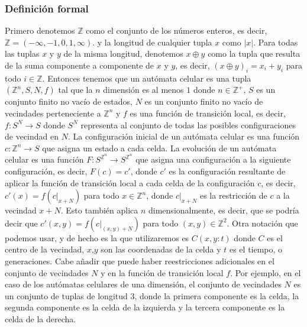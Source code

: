 \subsubsection{Definici\'on formal}
    \label{sec:AutomatasCelDefFormal}
    Primero denotemos $\mathbb{Z}$ como el conjunto de los n\'umeros enteros, es decir, $\mathbb{Z} = (-\infty,-1 ,0,1, \infty)$.
        y la longitud de cualquier tupla $x$ como $|x|$. Para todas las tuplas $x$ y $y$ de la misma longitud, denotemos $x \oplus y$
        como la tupla que resulta de la suma componente a componente de $x$ y $y$, es decir, $(x \oplus y)_i = x_i + y_i$ para todo 
        $i \in \mathbb{Z}$.
    \vskip 0.5cm
    Entonces tenemos que un aut\'omata celular es una tupla $({\mathbb{Z}^{n}},S,N,f)$ tal que la $n$ dimensi\'on es al menos $1$ donde 
        $n \in \mathbb{Z}^{+}$, $S$ es un conjunto finito no vac\'io de estados, $N$ es un conjunto finito no vac\'io de vecindades 
        perteneciente a ${\mathbb{Z}^{n}}$ y $f$ es una funci\'on de transici\'on local, es decir, $f: S^N \rightarrow S$ donde
        $S^N$ representa al conjunto de todas las posibles configuraciones de vecindad en $N$.
    \vskip 0.5cm
    La configuraci\'on inicial de un aut\'omata celular es una funci\'on $c: {\mathbb{Z}^{n}} \rightarrow S$ que asigna un estado a cada celda.
        La evoluci\'on de un aut\'omata celular es una funci\'on $F: S^{{\mathbb{Z}^{n}}} \rightarrow S^{{\mathbb{Z}^{n}}}$ que asigna una configuraci\'on a la siguiente
        configuraci\'on, es decir, $F(c) = c'$, donde $c'$ es la configuraci\'on resultante de aplicar la funci\'on de transici\'on local a cada
        celda de la configuraci\'on $c$, es decir, $c'(x) = f(c|_{x+N})$ para todo $x \in {\mathbb{Z}^{n}}$, donde $c|_{x+N}$ es la restricci\'on de $c$ a la vecindad $x+N$.
        Esto tambi\'en aplica $n$ dimensionalmente, es decir, que se podr\'ia decir que $c'(x,y) = f(c|_{(x,y)+N})$ para todo $(x,y) \in {\mathbb{Z}^{2}}$.
        Otra notaci\'on que podemos usar, y de hecho es la que utilizaremos es $C(x,y:t)$ donde $C$ es el centro de la vecindad, $x$,$y$ son las coordenadas de la celda y $t$ es el tiempo,
        o generaciones.
    \vskip 0.5cm
    Cabe a\~nadir que puede haber reestricciones adicionales en el conjunto de vecindades $N$ y en la funci\'on de transici\'on local $f$.
        Por ejemplo, en el caso de los aut\'omatas celulares de una dimensi\'on, el conjunto de vecindades $N$ es un conjunto de tuplas de longitud 3,
        donde la primera componente es la celda, la segunda componente es la celda de la izquierda y la tercera componente es la celda de la derecha.
